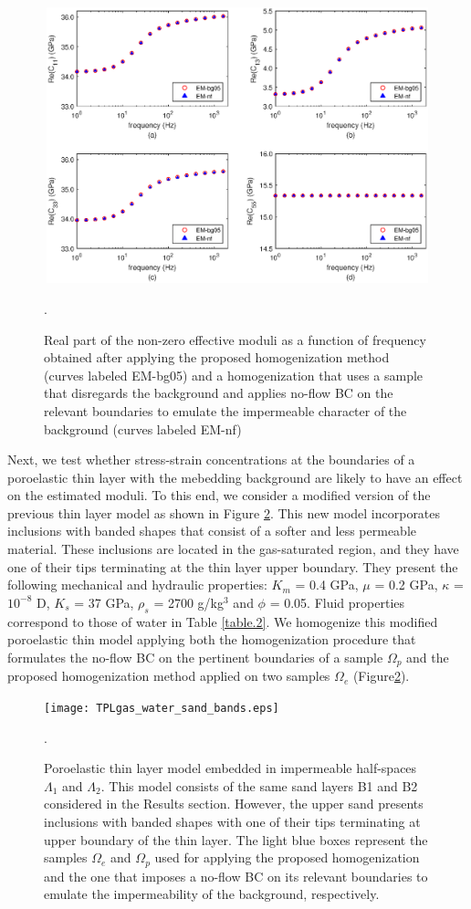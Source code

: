 \documentclass[draft]{agujournal2019}
\begin{document}
\begin{figure}[!ht]
\centering
        \includegraphics[width= 120mm, height=80mm]{cijnf_2sandshale.eps}
\caption{Real part of the non-zero effective moduli as a function of frequency obtained after applying the proposed homogenization method (curves labeled EM-bg05) and a homogenization that uses a sample that disregards the background and applies no-flow BC on the relevant boundaries to emulate the impermeable character of the background (curves labeled EM-nf)}. 
\label{fig.6}
\end{figure}

Next, we test whether stress-strain concentrations at the boundaries of a poroelastic thin layer with the mebedding  background are likely to have an effect on the estimated moduli. To this end, we consider a modified version of the previous thin layer model as shown in Figure \ref{fig.7}. This new model incorporates inclusions with banded shapes that consist of a softer and less permeable material. These inclusions are located in the gas-saturated region, and they have one of their tips terminating at the thin layer upper boundary. They present the following mechanical and hydraulic properties: $K_m$ = 0.4 GPa,  $\mu$ = 0.2 GPa, $\kappa$ = $10^{-8}$ D, $K_s$ = 37 GPa, $\rho_s$ = 2700 g/kg$^3$ and $\phi$ = 0.05. Fluid properties correspond to those of water in Table \ref{table.2}. We homogenize this modified poroelastic thin model  applying both the homogenization procedure that formulates the no-flow BC on the pertinent boundaries of a sample $\Omega_p$ and the proposed homogenization method applied on two samples $\Omega_e$ (Figure\ref{fig.7}).

\begin{figure}[!ht]
\centering
        \texttt{[image: TPLgas\_water\_sand\_bands.eps]}
\caption{Poroelastic thin layer model embedded in impermeable half-spaces $\Lambda_1$ and $\Lambda_2$. This model consists of the same sand layers B1 and B2 considered in the Results section. However, the upper sand presents inclusions with banded shapes with one of their tips terminating at upper boundary of the thin layer. The light blue boxes represent the samples $\Omega_e$ and $\Omega_p$ used for applying the proposed homogenization and the one that imposes a no-flow BC on its relevant boundaries to emulate the impermeability of the background, respectively.}. 
\label{fig.7}
\end{figure}
\end{document}
